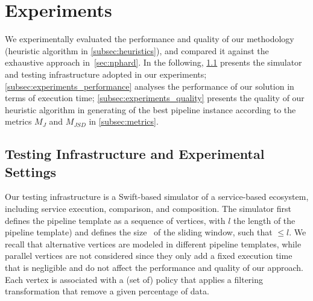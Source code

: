 \section{Experiments}\label{sec:experiment}
We experimentally evaluated the performance and quality of our methodology (heuristic algorithm in \cref{subsec:heuristics}), and compared it against the exhaustive approach in~\cref{sec:nphard}. In the following,
\cref{subsec:experiments_infrastructure} presents the simulator and testing infrastructure adopted in our experiments;
\cref{subsec:experiments_performance} analyses the performance of our solution in terms of execution time; \cref{subsec:experiments_quality} presents the quality of our heuristic algorithm in generating of the best pipeline instance according to the metrics $M_J$ and $M_{JSD}$ in \cref{subsec:metrics}.

\subsection{Testing Infrastructure and Experimental Settings}\label{subsec:experiments_infrastructure}
Our testing infrastructure is a Swift-based simulator of a service-based ecosystem, including service execution, comparison, and composition. The simulator first defines the pipeline template as a sequence of vertices, with $l$ the length of the pipeline template) and defines the size \windowsize\ of the sliding window, such that \windowsize$\leq$$l$. We recall that alternative vertices are modeled in different pipeline templates, while parallel vertices are not considered since they only add a fixed execution time that is negligible and do not affect the performance and quality of our approach. Each vertex is associated with a (set of) policy that applies a filtering transformation that remove a given percentage of data.

